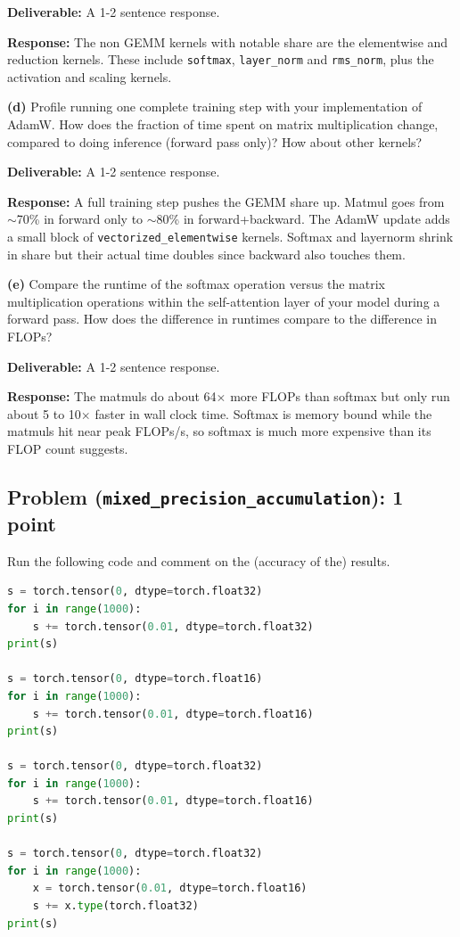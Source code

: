 \documentclass[11pt]{article}
\begin{document}
\textbf{Deliverable:} A 1-2 sentence response.

\vspace{0.25cm}
\textbf{Response:}
The non GEMM kernels with notable share are the elementwise and reduction kernels. These include \texttt{softmax}, \texttt{layer\_norm} and \texttt{rms\_norm}, plus the activation and scaling kernels.

\vspace{0.25cm}
\textbf{(d)} Profile running one complete training step with your implementation of AdamW. How does the fraction of time spent on matrix multiplication change, compared to doing inference (forward pass only)? How about other kernels?

\textbf{Deliverable:} A 1-2 sentence response.

\vspace{0.25cm}
\textbf{Response:}
A full training step pushes the GEMM share up. Matmul goes from $\sim$70\% in forward only to $\sim$80\% in forward+backward. The AdamW update adds a small block of \texttt{vectorized\_elementwise} kernels. Softmax and layernorm shrink in share but their actual time doubles since backward also touches them.

\vspace{0.25cm}
\textbf{(e)} Compare the runtime of the softmax operation versus the matrix multiplication operations within the self-attention layer of your model during a forward pass. How does the difference in runtimes compare to the difference in FLOPs?

\textbf{Deliverable:} A 1-2 sentence response.

\vspace{0.25cm}
\textbf{Response:}
The matmuls do about 64$\times$ more FLOPs than softmax but only run about 5 to 10$\times$ faster in wall clock time. Softmax is memory bound while the matmuls hit near peak FLOPs/s, so softmax is much more expensive than its FLOP count suggests.
\subsection*{Problem (\texttt{mixed\_precision\_accumulation}): 1 point}

Run the following code and comment on the (accuracy of the) results.

\begin{lstlisting}[language=Python]
s = torch.tensor(0, dtype=torch.float32)
for i in range(1000):
    s += torch.tensor(0.01, dtype=torch.float32)
print(s)

s = torch.tensor(0, dtype=torch.float16)
for i in range(1000):
    s += torch.tensor(0.01, dtype=torch.float16)
print(s)

s = torch.tensor(0, dtype=torch.float32)
for i in range(1000):
    s += torch.tensor(0.01, dtype=torch.float16)
print(s)

s = torch.tensor(0, dtype=torch.float32)
for i in range(1000):
    x = torch.tensor(0.01, dtype=torch.float16)
    s += x.type(torch.float32)
print(s)
\end{lstlisting}
\end{document}
